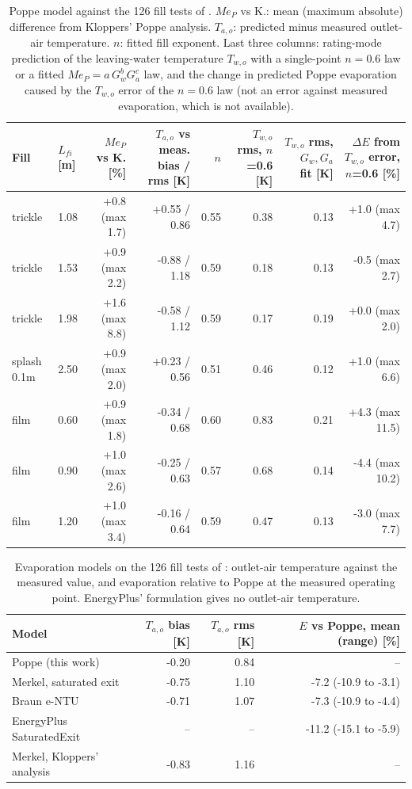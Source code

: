\documentclass[preprint,12pt]{elsarticle}
\begin{document}
\begin{table}[t]\centering\scriptsize
\caption{Poppe model against the 126 fill tests of \citet{kloppers2003critical}. $Me_P$ vs K.: mean (maximum absolute)
difference from Kloppers' Poppe analysis. $T_{a,o}$: predicted minus measured outlet-air temperature. $n$: fitted fill
exponent. Last three columns: rating-mode prediction of the leaving-water temperature $T_{w,o}$ with a single-point
$n=0.6$ law or a fitted $Me_P=a\,G_w^{b}G_a^{c}$ law, and the change in predicted Poppe evaporation caused by the
$T_{w,o}$ error of the $n=0.6$ law (not an error against measured evaporation, which is not available).}\label{tab:kloppers}
\begin{tabular}{llrrrrrr}
\toprule
Fill & $L_{fi}$ [m] & $Me_P$ vs K. [\%] & $T_{a,o}$ vs meas. bias / rms [K] & $n$ & $T_{w,o}$ rms, $n$=0.6 [K] & $T_{w,o}$ rms, $G_w,G_a$ fit [K] & $\Delta E$ from $T_{w,o}$ error, $n$=0.6 [\%] \\
\midrule
trickle & 1.08 & +0.8 (max 1.7) & +0.55 / 0.86 & 0.55 & 0.38 & 0.13 & +1.0 (max 4.7) \\
trickle & 1.53 & +0.9 (max 2.2) & -0.88 / 1.18 & 0.59 & 0.18 & 0.13 & -0.5 (max 2.7) \\
trickle & 1.98 & +1.6 (max 8.8) & -0.58 / 1.12 & 0.59 & 0.17 & 0.19 & +0.0 (max 2.0) \\
splash 0.1m & 2.50 & +0.9 (max 2.0) & +0.23 / 0.56 & 0.51 & 0.46 & 0.12 & +1.0 (max 6.6) \\
film & 0.60 & +0.9 (max 1.8) & -0.34 / 0.68 & 0.60 & 0.83 & 0.21 & +4.3 (max 11.5) \\
film & 0.90 & +1.0 (max 2.6) & -0.25 / 0.63 & 0.57 & 0.68 & 0.14 & -4.4 (max 10.2) \\
film & 1.20 & +1.0 (max 3.4) & -0.16 / 0.64 & 0.59 & 0.47 & 0.13 & -3.0 (max 7.7) \\
\bottomrule
\end{tabular}
\end{table}

\begin{table}[t]\centering\small
\caption{Evaporation models on the 126 fill tests of \citet{kloppers2003critical}: outlet-air temperature against the
measured value, and evaporation relative to Poppe at the measured operating point. EnergyPlus' formulation gives no
outlet-air temperature.}\label{tab:kloppermodels}
\begin{tabular}{lrrr}
\toprule
Model & $T_{a,o}$ bias [K] & $T_{a,o}$ rms [K] & $E$ vs Poppe, mean (range) [\%] \\
\midrule
Poppe (this work) & -0.20 & 0.84 & -- \\
Merkel, saturated exit & -0.75 & 1.10 & -7.2 (-10.9 to -3.1) \\
Braun e-NTU & -0.71 & 1.07 & -7.3 (-10.9 to -4.4) \\
EnergyPlus SaturatedExit & -- & -- & -11.2 (-15.1 to -5.9) \\
Merkel, Kloppers' analysis & -0.83 & 1.16 & -- \\
\bottomrule
\end{tabular}
\end{table}
\end{document}
